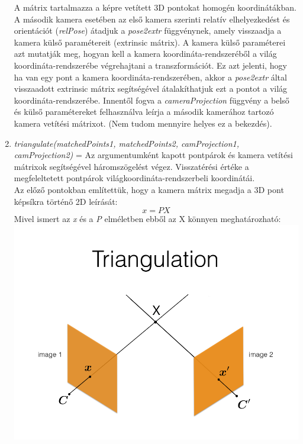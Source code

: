 \documentclass[12pt]{report}
\begin{document}
\begin{enumerate}
                    A mátrix tartalmazza a képre vetített 3D pontokat homogén koordinátákban.\\
                    A második kamera esetében az első kamera szerinti relatív elhelyezkedést és orientációt (\textit{relPose}) átadjuk a \textit{pose2extr} függvénynek, amely visszaadja a kamera külső paramétereit (extrinsic mátrix). A kamera külső paraméterei azt mutatják meg, hogyan kell a kamera koordináta-rendszeréből a világ koordináta-rendszerébe végrehajtani a transzformációt. Ez azt jelenti, hogy ha van egy pont a kamera koordináta-rendszerében, akkor a \textit{pose2extr} által visszaadott extrinsic mátrix segítségével átalakíthatjuk ezt a pontot a világ koordináta-rendszerébe. Innentől fogva a \textit{cameraProjection} függvény a belső és külső paramétereket felhasználva leírja a második kamerához tartozó kamera vetítési mátrixot. (Nem tudom mennyire helyes ez a bekezdés).
                    \item \textit{triangulate(matchedPoints1, matchedPoints2, camProjection1, camProjection2)} = Az argumentumként kapott pontpárok és kamera vetítési mátrixok segítségével háromszögelést végez. Visszatérési értéke a megfeleltetett pontpárok világkoordináta-rendszerbeli koordinátái.\\
                    Az előző pontokban említettük, hogy a kamera mátrix megadja a 3D pont képsíkra történő 2D leírását:
                    \[x = PX\]
                Mivel ismert az \textit{x} és a \textit{P} elméletben ebből az X könnyen meghatározható:\\
                    \includegraphics[scale=0.4]{triangulation.png}

\end{enumerate}
\end{document}
